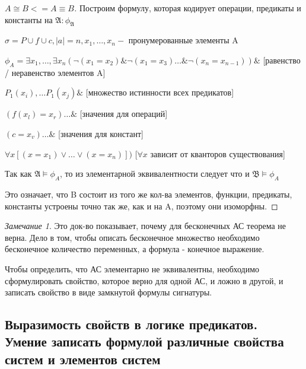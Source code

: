 \documentclass[a4paper]{article}
\theoremstyle{definition}
\theoremstyle{remark}
\newtheorem*{remark}{Замечание}
\begin{document}
    \begin{proof} [$A\cong B <= A\equiv B$]
        Построим формулу, которая кодирует операции, предикаты и константы на $\mathfrak{A} : \phi_\mathfrak{A}$
        
        $\sigma = P\cup f\cup c, |a| = n, x_1, \dots, x_n - $ пронумерованные элементы A
        
        $\phi_A = \exists x_1, \dots, \exists x_n (\neg(x_1 = x_2) \& \neg (x_1 = x_3) \dots \& \neg (x_n = x_{n-1})) \&$ [равенство / неравенство элементов A]

        $P_1(x_i), \dots P_1(x_j) \&$ [множество истинности всех предикатов]

        $(f(x_l) = x_r) \dots\&$ [значения для операций]

        $(c = x_v)\dots\&$ [значения для констант]

        $\forall x[(x = x_1) \vee \dots \vee (x = x_n)])$ [$\forall x$ зависит от кванторов существования]

        Так как $\mathfrak{A}\models \phi_A$, то из элементарной эквивалентности следует что и $\mathfrak{B} \models \phi_A$

        Это означает, что B состоит из того же кол-ва элементов, функции, предикаты, константы устроены точно так же, как и на A, поэтому они изоморфны.
    \end{proof}
    \begin{remark}
        Это док-во показывает, почему для бесконечных АС теорема не верна. Дело в том, чтобы описать бесконечное множество
        необходимо бесконечное количество переменных, а формула - конечное выражение.
    \end{remark}

    Чтобы определить, что АС элементарно не эквивалентны, необходимо сформулировать свойство, которое верно для одной АС, и ложно в другой,
    и записать свойство в виде замкнутой формулы сигнатуры.
    \subsection{Выразимость свойств в логике предикатов. Умение записать формулой различные свойства систем и элементов систем}
\end{document}
